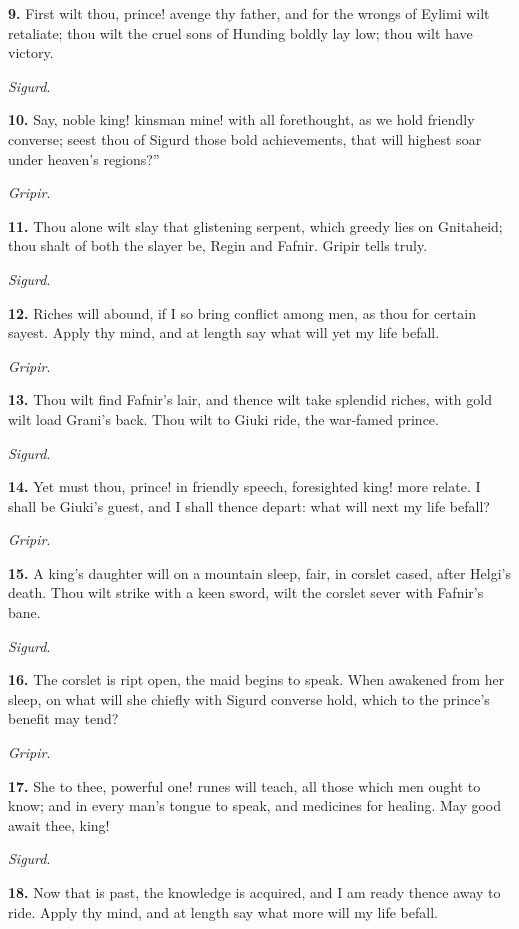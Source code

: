 \textbf{9.} First wilt thou, prince! avenge thy father, and for the wrongs of
Eylimi wilt retaliate; thou wilt the cruel sons of Hunding boldly lay
low; thou wilt have victory.

\emph{Sigurd}.

\textbf{10.} Say, noble king! kinsman mine! with all forethought, as we hold
friendly converse; seest thou of Sigurd those bold achievements, that
will highest soar under heaven's regions?''

\emph{Gripir}.

\textbf{11.} Thou alone wilt slay that glistening serpent, which greedy lies
on Gnitaheid; thou shalt of both the slayer be, Regin and Fafnir.
Gripir tells truly.

\emph{Sigurd}.

\textbf{12.} Riches will abound, if I so bring conflict among men, as thou
for certain sayest. Apply thy mind, and at length say what will yet my
life befall.

\emph{Gripir}.

\textbf{13.} Thou wilt find Fafnir's lair, and thence wilt take splendid
riches, with gold wilt load Grani's back. Thou wilt to Giuki ride, the
war-famed prince.

\emph{Sigurd}.

\textbf{14.} Yet must thou, prince! in friendly speech, foresighted king!
more relate. I shall be Giuki's guest, and I shall thence depart: what
will next my life befall?

\emph{Gripir}.

\textbf{15.} A king's daughter will on a mountain sleep, fair, in corslet
cased, after Helgi's death. Thou wilt strike with a keen sword, wilt
the corslet sever with Fafnir's bane.

\emph{Sigurd}.

\textbf{16.} The corslet is ript open, the maid begins to speak. When
awakened from her sleep, on what will she chiefly with Sigurd converse
hold, which to the prince's benefit may tend?

\emph{Gripir}.

\textbf{17.} She to thee, powerful one! runes will teach, all those which
men ought to know; and in every man's tongue to speak, and medicines
for healing. May good await thee, king!

\emph{Sigurd}.

\textbf{18.} Now that is past, the knowledge is acquired, and I am ready
thence away to ride. Apply thy mind, and at length say what more will
my life befall.

